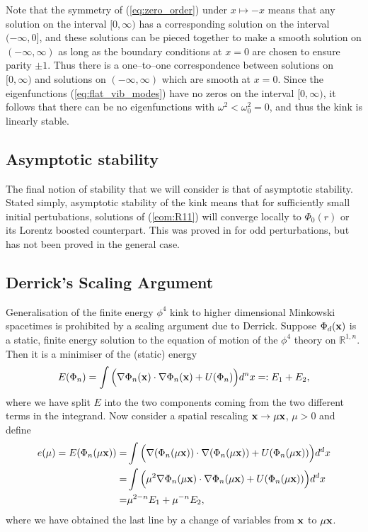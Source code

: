 Note that the symmetry of (\ref{eq:zero_order}) under $x\mapsto -x$ means that any solution on the interval $[0,\infty)$ has a corresponding solution on the interval $(-\infty,0]$, and these solutions can be pieced together to make a smooth solution on $(-\infty,\infty)$ as long as the boundary conditions at $x=0$ are chosen to ensure parity $\pm1$. Thus there is a one--to--one correspondence between solutions on $[0,\infty)$ and solutions on $(-\infty,\infty)$ which are smooth at $x=0$.
Since the eigenfunctions (\ref{eq:flat_vib_modes}) have no zeros on the interval $[0,\infty)$, it follows that there can be no eigenfunctions with $\omega^2<\omega_0^2=0$, and thus the kink is linearly stable.

\subsection{Asymptotic stability}
The final notion of stability that we will consider is that of asymptotic stability. Stated simply, asymptotic stability of the kink means that for sufficiently small initial pertubations, solutions of (\ref{eom:R11}) will converge locally to $\Phi_0(r)$ or its Lorentz boosted counterpart. This was proved in \cite{KowalczykMM} for odd perturbations, but has not been proved in the general case.

\subsection{Derrick's Scaling Argument}
Generalisation of the finite energy $\phi^4$ kink to higher dimensional Minkowski spacetimes is prohibited by a scaling argument due to Derrick. Suppose $\Phi_d({\bf x})$ is a static, finite energy solution to the equation of motion of the $\phi^4$ theory on $\mathbb{R}^{1,n}$. Then it is a minimiser of the (static) energy
\[
E(\Phi_n)=\int\Big(\nabla\Phi_n({\bf x})\cdot\nabla\Phi_n({\bf x}) + U(\Phi_n)\Big)d^nx=:E_1+E_2,
\]
where we have split $E$ into the two components coming from the two different terms in the integrand. Now consider a spatial rescaling ${\bf x}\rightarrow\mu{\bf x}$, $\mu>0$ and define 
\begin{align*}
e(\mu)= E(\Phi_n(\mu{\bf x}))=&\int\Big(\nabla(\Phi_n(\mu {\bf x}))\cdot\nabla(\Phi_n(\mu {\bf x})) + U(\Phi_n(\mu {\bf x}))\Big)d^dx \\
=& \int\Big(\mu^2\nabla\Phi_n(\mu {\bf x})\cdot\nabla\Phi_n(\mu {\bf x}) + U(\Phi_n(\mu {\bf x}))\Big)d^dx \\
=& \mu^{2-n}E_1 + \mu^{-n}E_2,
\end{align*}
where we have obtained the last line by a change of variables from ${\bf x}$ to $\mu{\bf x}$.

